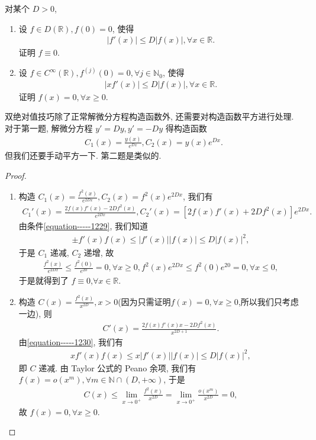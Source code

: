 \documentclass[../../main.tex]{subfiles}
\begin{document}
\begin{example}\label{example:双绝对值经典问题}
对某个 $D > 0$,
\begin{enumerate}
\item 设 $f\in D(\mathbb{R}),f(0)=0$, 使得
\begin{align}\label{equation-----1229}
|f'(x)|\leqslant D|f(x)|,\forall x\in\mathbb{R}.
\end{align}
证明 $f\equiv0$.

\item 设 $f\in C^\infty(\mathbb{R}),f^{(j)}(0)=0,\forall j\in\mathbb{N}_0$, 使得
\begin{align}\label{equation-----1230}
|xf'(x)|\leqslant D|f(x)|,\forall x\in\mathbb{R}.
\end{align}
证明 $f(x)=0,\forall x\geqslant0$.
\end{enumerate}
\end{example}
\begin{note}
双绝对值技巧除了正常解微分方程构造函数外, 还需要对构造函数平方进行处理. 对于第一题, 解微分方程 $y' = Dy,y' = -Dy$ 得构造函数
\begin{align*}
C_1(x)=\frac{y(x)}{e^{Dx}},C_2(x)=y(x)e^{Dx}.
\end{align*}
但我们还要手动平方一下. 第二题是类似的.
\end{note}
\begin{proof}
\begin{enumerate}
\item 构造 $C_1(x)=\frac{f^2(x)}{e^{2Dx}},C_2(x)=f^2(x)e^{2Dx}$, 我们有
\begin{align*}
C_1'(x)=\frac{2f(x)f'(x)-2Df^2(x)}{e^{2Dx}},C_2'(x)=[2f(x)f'(x)+2Df^2(x)]e^{2Dx}.
\end{align*}
由条件\eqref{equation-----1229}, 我们知道
\begin{align*}
\pm f'(x)f(x)\leqslant|f'(x)||f(x)|\leqslant D|f(x)|^2,
\end{align*}
于是 $C_1$ 递减, $C_2$ 递增, 故
\begin{align*}
\frac{f^2(x)}{e^{2Dx}}\leqslant\frac{f^2(0)}{e^{20}}=0,\forall x\geqslant0,f^2(x)e^{2Dx}\leqslant f^2(0)e^{20}=0,\forall x\leqslant0,
\end{align*}
于是就得到了 $f\equiv0$,$\forall x\in \mathbb{R}$.

\item 构造 $C(x)=\frac{f^2(x)}{x^{2D}},x>0$(因为只需证明$f(x)=0,\forall x\geqslant0$,所以我们只考虑一边), 则
\begin{align*}
C'(x)=\frac{2f(x)f'(x)x - 2Df^2(x)}{x^{2D + 1}}.
\end{align*}
由\eqref{equation-----1230}, 我们有
\begin{align*}
xf'(x)f(x)\leqslant x|f'(x)||f(x)|\leqslant D|f(x)|^2,
\end{align*}
即 $C$ 递减. 由 Taylor 公式的 Peano 余项, 我们有 $f(x)=o(x^m),\forall m\in\mathbb{N}\cap (D,+\infty)$, 于是 
\begin{align*}
C(x)\leqslant \lim_{x\rightarrow 0^+} \frac{f^2(x)}{x^{2D}}=\lim_{x\rightarrow 0^+} \frac{o\left( x^m \right)}{x^{2D}}=0,
\end{align*}
故 $f(x)=0,\forall x\geqslant0$. 
\end{enumerate}
\end{proof}
\end{document}
